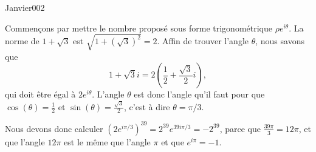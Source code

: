 \begin{corrige}{Janvier002}


Commençons par mettre le nombre proposé sous forme trigonométrique $\rho e^{i\theta}$. La norme de $1+\sqrt{3}$ est $\sqrt{1+(\sqrt{3})^2}=2$. Affin de trouver l'angle $\theta$, nous savons que
\begin{equation}
	1+\sqrt{3}i=2(\frac{ 1 }{2}+\frac{ \sqrt{3} }{ 2 }i),
\end{equation}
qui doit être égal à $2 e^{i\theta}$. L'angle $\theta$ est donc l'angle qu'il faut pour que $\cos(\theta)=\frac{1}{ 2 }$ et $\sin(\theta)=\frac{ \sqrt{3} }{ 2 }$, c'est à dire $\theta=\pi/3$.

Nous devons donc calculer $\left( 2 e^{i\pi/3} \right)^{39}=2^{39} e^{39i\pi/3}=-2^{39}$, parce que $\frac{ 39\pi }{ 3 }=12\pi$, et que l'angle $12\pi$ est le même que l'angle $\pi$ et que $ e^{i\pi}=-1$.

\end{corrige}
